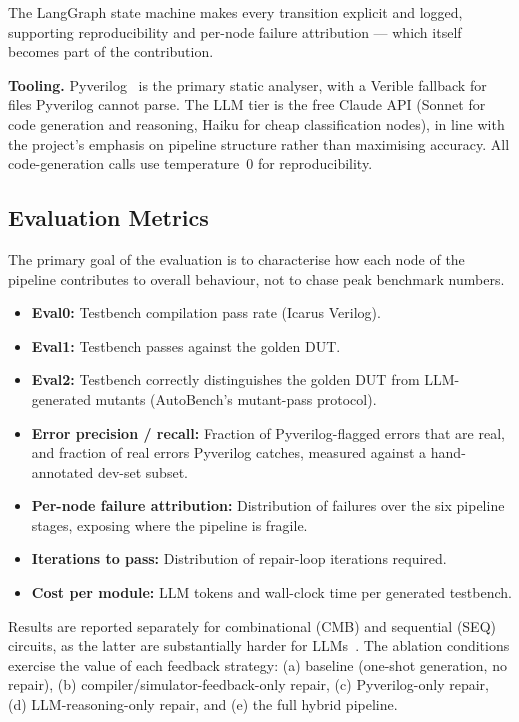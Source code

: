 \documentclass[11pt,a4paper, titlepage=false]{scrreprt}
\begin{document}
\noindent The LangGraph state machine makes every transition explicit and logged, supporting
reproducibility and per-node failure attribution --- which itself becomes part of the
contribution.

\medskip
\noindent\textbf{Tooling.} Pyverilog~\cite{takamaeda2015pyverilog} is the primary static
analyser, with a Verible fallback for files Pyverilog cannot parse. The LLM tier is the free
Claude API (Sonnet for code generation and reasoning, Haiku for cheap classification nodes), in
line with the project's emphasis on pipeline structure rather than maximising accuracy. All
code-generation calls use temperature~0 for reproducibility.

\subsection*{Evaluation Metrics}

The primary goal of the evaluation is to characterise how each node of the pipeline contributes
to overall behaviour, not to chase peak benchmark numbers.

\begin{itemize}
    \item \textbf{Eval0:} Testbench compilation pass rate (Icarus Verilog).
    \item \textbf{Eval1:} Testbench passes against the golden DUT.
    \item \textbf{Eval2:} Testbench correctly distinguishes the golden DUT from LLM-generated
    mutants (AutoBench's mutant-pass protocol).
    \item \textbf{Error precision / recall:} Fraction of Pyverilog-flagged errors that are real,
    and fraction of real errors Pyverilog catches, measured against a hand-annotated dev-set
    subset.
    \item \textbf{Per-node failure attribution:} Distribution of failures over the six pipeline
    stages, exposing where the pipeline is fragile.
    \item \textbf{Iterations to pass:} Distribution of repair-loop iterations required.
    \item \textbf{Cost per module:} LLM tokens and wall-clock time per generated testbench.
\end{itemize}

\noindent Results are reported separately for combinational (CMB) and sequential (SEQ)
circuits, as the latter are substantially harder for LLMs~\cite{qiu2024autobench}. The
ablation conditions exercise the value of each feedback strategy: (a) baseline (one-shot
generation, no repair), (b) compiler/simulator-feedback-only repair, (c) Pyverilog-only repair,
(d) LLM-reasoning-only repair, and (e) the full hybrid pipeline.
\end{document}
